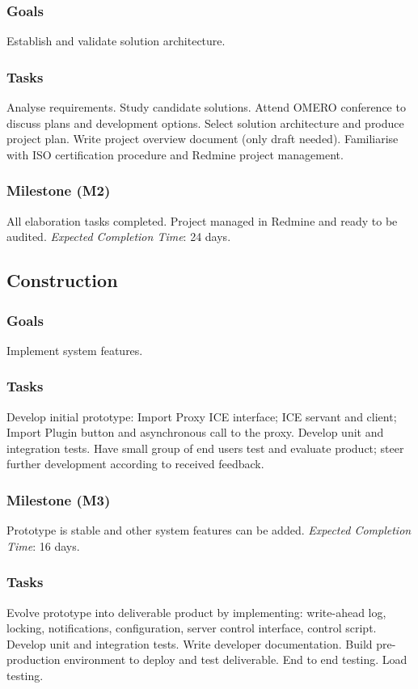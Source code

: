 \subsubsection*{Goals}
Establish and validate solution architecture. 

\subsubsection*{Tasks} 
Analyse requirements.
Study candidate solutions.
Attend OMERO conference to discuss plans and development options.
Select solution architecture and produce project plan.
Write project overview document (only draft needed).
Familiarise with ISO certification procedure and Redmine project management.

\subsubsection*{Milestone (M2)}
All elaboration tasks completed. Project managed in Redmine and ready to be audited.
\emph{Expected Completion Time}: 24 days.

\subsection{Construction}

\subsubsection*{Goals}
Implement system features. 

\subsubsection*{Tasks} 
Develop initial prototype: Import Proxy ICE interface; ICE servant and client; Import
Plugin button and asynchronous call to the proxy.
Develop unit and integration tests. 
Have small group of end users test and evaluate product; steer further development
according to received feedback.

\subsubsection*{Milestone (M3)}
Prototype is stable and other system features can be added.
\emph{Expected Completion Time}: 16 days. %

\subsubsection*{Tasks} 
Evolve prototype into deliverable product by implementing: write-ahead log, locking,
notifications, configuration, server control interface, control script.
Develop unit and integration tests.
Write developer documentation.
Build pre-production environment to deploy and test deliverable.
End to end testing.
Load testing.

